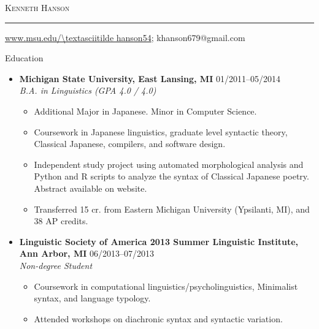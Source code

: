\documentclass[10pt,oneside]{article}
\makeatletter
\newcommand{\name}{Kenneth Hanson}
\newcommand{\email}{khanson679@gmail.com}
\newcommand{\website}{www.msu.edu/\textasciitilde hanson54}
\newcommand{\bigname}[1]{
	\begin{center}\selectfont\Huge\scshape#1\end{center}
}
\newenvironment{ressection}[1]{
	\vspace{4pt}
	{\selectfont\Large#1}
	\begin{itemize}
	\vspace{3pt}
}{
	\end{itemize}
}
\newcommand{\ressubitem}[1]{
	\vspace{-1pt}
	\item \begin{flushleft} #1 \end{flushleft}
}
\newcommand{\resbigitem}[4]{
	\vspace{-5pt}
	\item
	\textbf{#1} \hfill #2 \\
	\textit{#3} \hfill \textit{#4}
}
\newenvironment{ressubsec}[4]{
	\resbigitem{#1}{#2}{#3}{#4}
	\vspace{-2pt}
	\begin{itemize}
}{
	\end{itemize}
}
\makeatother
\begin{document}

\bigname{\name}

\vspace{-8pt} \rule{\textwidth}{1pt}

\vspace{-1pt} {\small \hfill \url{\website}; \email}

\vspace{8 pt}


\begin{ressection}{Education}

	\begin{ressubsec}{Michigan State University, East Lansing, MI}
            {01/2011--05/2014}
		    {B.A. in Linguistics (GPA 4.0 / 4.0)}
            {}
		\ressubitem{Additional Major in Japanese. Minor in Computer Science.}
		\ressubitem{Coursework in Japanese linguistics, graduate level syntactic theory, Classical Japanese, compilers, and software design.}
		\ressubitem{Independent study project using automated morphological analysis and Python and R scripts to analyze the syntax of Classical Japanese poetry. Abstract available on website.}
		\ressubitem{Transferred 15 cr. from Eastern Michigan University (Ypsilanti, MI), and 38 AP credits.}
	\end{ressubsec}
    
    \begin{ressubsec}{Linguistic Society of America 2013 Summer Linguistic Institute, Ann Arbor, MI}
            {06/2013--07/2013}
            {Non-degree Student}
            {}
            \ressubitem{Coursework in computational linguistics/psycholinguistics, Minimalist syntax, and language typology.}
            \ressubitem{Attended workshops on diachronic syntax and syntactic variation.}
	\end{ressubsec}
\end{ressection}
\end{document}
